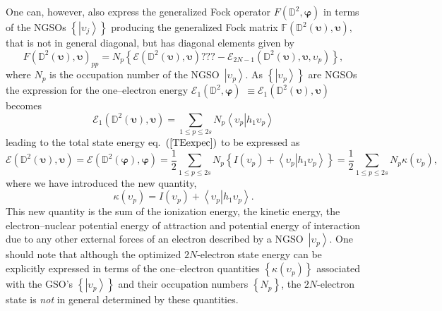\documentclass[aps,preprint]{revtex4}%
\begin{document}
One can, however, also express the generalized Fock operator $F\left(
\mathbb{D}^{2},\mathbf{\varphi}\right)  $ in terms of the NGSOs $\left\{
\left\vert \upsilon_{j}\right\rangle \right\}  $ producing the generalized
Fock matrix $\mathbb{F}\left(  \mathbb{D}^{2}\left(  \mathbf{\upsilon}\right)
,\mathbf{\upsilon}\right)  ,$ that is not in general diagonal, but has
diagonal elements given by
\begin{equation}
F\left(  \mathbb{D}^{2}\left(  \mathbf{\upsilon}\right)  ,\mathbf{\upsilon
}\right)  _{pp}=N_{p}\left\{  \mathcal{E}\left(  \mathbb{D}^{2}\left(
\mathbf{\upsilon}\right)  ,\mathbf{\upsilon}\right)  ???-\mathcal{E}%
_{2N-1}\left(  \mathbb{D}^{2}\left(  \mathbf{\upsilon}\right)
,\mathbf{\upsilon,}\upsilon_{p}\right)  \right\}  ,
\end{equation}
where $N_{p}$ is the occupation number of the NGSO\ $\left\vert \upsilon
_{p}\right\rangle $. As $\left\{  \left\vert \upsilon_{p}\right\rangle
\right\}  $ are NGSOs the expression for the one--electron energy
$\mathcal{E}_{1}\left(  \mathbb{D}^{2},\mathbf{\varphi}\right)  $
$\equiv\mathcal{E}_{1}\left(  \mathbb{D}^{2}\left(  \mathbf{\upsilon}\right)
,\mathbf{\upsilon}\right)  $ becomes%
\begin{equation}
\mathcal{E}_{1}\left(  \mathbb{D}^{2}\left(  \mathbf{\upsilon}\right)
,\mathbf{\upsilon}\right)  =\sum_{1\leq p\leq2s}N_{p}\left\langle \left.
\upsilon_{p}\right\vert h_{1}\upsilon_{p}\right\rangle
\end{equation}
leading to the total state energy eq.\ $\left(  \ref{TEexpec}\right)  $ to be
expressed as
\begin{equation}
\mathcal{E}\left(  \mathbb{D}^{2}\left(  \mathbf{\upsilon}\right)
,\mathbf{\upsilon}\right)  =\mathcal{E}\left(  \mathbb{D}^{2}\left(
\mathbf{\varphi}\right)  ,\mathbf{\varphi}\right)  =\frac{1}{2}\sum_{1\leq
p\leq2s}N_{p}\left\{  I\left(  \upsilon_{p}\right)  +\left\langle \left.
\upsilon_{p}\right\vert h_{1}\upsilon_{p}\right\rangle \right\}  =\frac{1}{2}%
{\textstyle\sum\limits_{1\leq p\leq2s}}
N_{p}\kappa\left(  \upsilon_{p}\right)  , \label{Enkappa}%
\end{equation}
where we have introduced the new quantity,
\begin{equation}
\kappa\left(  \upsilon_{p}\right)  =I\left(  \upsilon_{p}\right)
+\left\langle \left.  \upsilon_{p}\right\vert h_{1}\upsilon_{p}\right\rangle .
\label{kappa}%
\end{equation}
This new quantity is the sum of the ionization energy, the kinetic energy, the
electron--nuclear potential energy of attraction and potential energy of
interaction due to any other external forces of an electron described by a
NGSO\ $\left\vert \upsilon_{p}\right\rangle $. One should note that although
the optimized $2N$-electron state energy can be explicitly expressed in terms
of the one--electron quantities $\left\{  \kappa\left(  \upsilon_{p}\right)
\right\}  $ associated with the GSO's $\left\{  \left\vert \upsilon
_{p}\right\rangle \right\}  $ and their occupation numbers $\left\{
N_{p}\right\}  $, the $2N$-electron state is \emph{not }in general determined
by these quantities.
\end{document}

